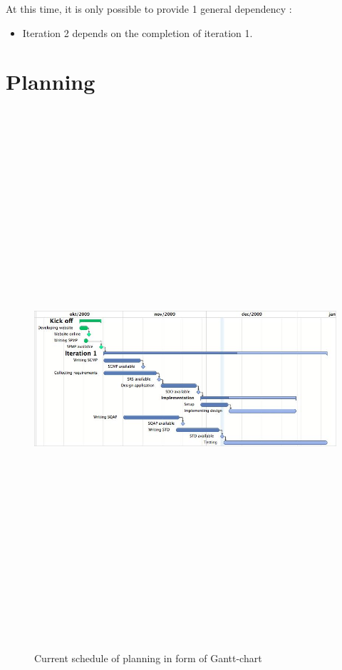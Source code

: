 \documentclass[a4paper, 12pt]{report}
\begin{document}
			At this time, it is only possible to provide 1 general dependency :
			
			\begin{itemize}
				
				\item Iteration 2 depends on the completion of iteration 1.
				
			\end{itemize}
			
			
			\section{Planning}	
				\label{planning}
			\begin{figure}
				\includegraphics[angle=90, height=20cm]{../../img/gantt-chart.jpg}
				\caption{Current schedule of planning in form of Gantt-chart}
			\end{figure}	
\end{document}

